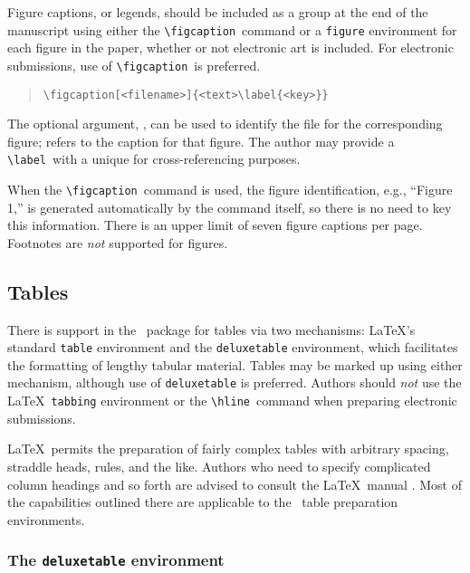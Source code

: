 \documentclass[preprint2]{aastex}
\begin{document}
Figure captions, or legends, should be included as a group at the end 
of the manuscript using either the \verb"\figcaption"\  command 
or a \texttt{figure} environment for each figure in 
the paper, whether or not electronic art is included. 
For electronic submissions, use of \verb"\figcaption"\ is preferred. 
 
\begin{quote} 
\begin{verbatim} 
\figcaption[<filename>]{<text>\label{<key>}} 
\end{verbatim} 
\end{quote} 
 
The optional argument, , can be used to iden\-ti\-fy 
the file for the corresponding figure; 
 refers to the caption for that figure.  The author 
may provide a \verb"\label"\ with a unique  for cross-referencing 
purposes. 
 
When the \verb"\figcaption"\  command is used, the figure 
identification, 
e.g., ``Figure 1,'' is generated automatically by the command itself, so 
there is no need to key this information. 
 There is an upper limit of seven figure captions per page. 
Footnotes are \emph{not} supported for figures. 
 
\subsection{Tables}  \label{tables} 
 
There is support in the \aastex\ package for tables via two mechanisms: 
\LaTeX's standard \texttt{table} environment 
and the 
\texttt{deluxetable} environment, which facilitates the formatting 
of lengthy tabular material.  Tables may be 
marked up using either mechanism, although use of 
\texttt{deluxetable} is preferred. 
Authors should \emph{not} use the \LaTeX\ 
\texttt{tabbing} environment 
or the \verb"\hline"\ 
 command when preparing electronic 
submissions. 
 
\LaTeX\ permits the preparation of fairly complex tables with 
arbitrary spacing, straddle heads, rules, and the like. 
Authors who need to specify complicated column headings and 
so forth are advised to consult the \LaTeX\ manual \citep{Lamport}. 
Most of the capabilities outlined there are applicable to  the \aastex\ 
 table preparation environments. 
 
\subsubsection{The {\tt deluxetable} environment}  \label{dte} 
 
\end{document}
